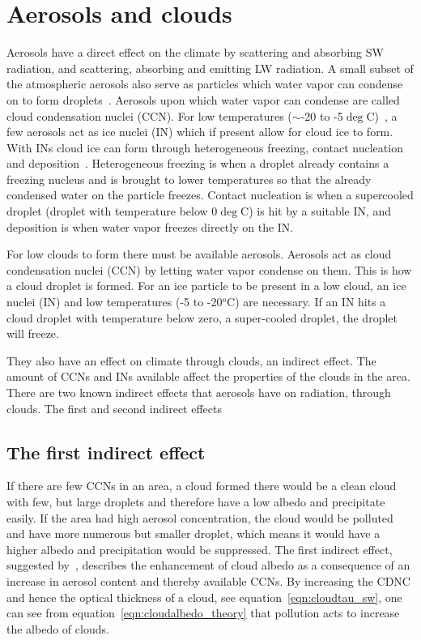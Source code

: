 \section{Aerosols and clouds}%
Aerosols have a direct effect on the climate by scattering and absorbing SW radiation, and scattering, absorbing and emitting LW radiation. A small subset of the atmospheric aerosols also serve as particles which water vapor can condense on to form droplets~\citep{Wallace2006}. Aerosols upon which water vapor can condense are called cloud condensation nuclei (CCN). For low temperatures ($\sim$-20 to -5$\deg$C)~\citep{Wallace2006}, a few aerosols act as ice nuclei (IN) which if present allow for cloud ice to form. With INs cloud ice can form through heterogeneous freezing, contact nucleation and deposition~\citep{Wallace2006}. Heterogeneous freezing is when a droplet already contains a freezing nucleus and is brought to lower temperatures so that the already condensed water on the particle freezes. Contact nucleation is when a supercooled droplet (droplet with temperature below 0$\deg$C) is hit by a suitable IN, and deposition is when water vapor freezes directly on the IN.

For low clouds to form there must be available aerosols. Aerosols act as cloud condensation nuclei (CCN) by letting water vapor condense on them. This is how a cloud droplet is formed. For an ice particle to be present in a low cloud, an ice nuclei (IN) and low temperatures (-5 to -20$^o$C)
are necessary. If an IN hits a cloud droplet with temperature below zero, a super-cooled droplet, the droplet will freeze.


They also have an effect on climate through clouds, an indirect effect. The amount of CCNs and INs available affect the properties of the clouds in the area. There are two known indirect effects that aerosols have on radiation, through clouds. The first and second indirect effects

\subsection{The first indirect effect}
If there are few CCNs in an area, a cloud formed there would be a clean cloud with few, but large droplets and therefore have a low albedo and precipitate easily. If the area had high aerosol concentration, the cloud would be polluted and have more numerous but smaller droplet, which means it would have a higher albedo and precipitation would be suppressed. 
The first indirect effect, suggested by~\citet{Twomey1974}, describes the enhancement of cloud albedo as a consequence of an increase in aerosol content and thereby available CCNs.
By increasing the CDNC and hence the optical thickness of a cloud, see equation~\ref{eqn:cloudtau_sw}, one can see from equation~\ref{eqn:cloudalbedo_theory} that pollution acts to increase the albedo of clouds.

